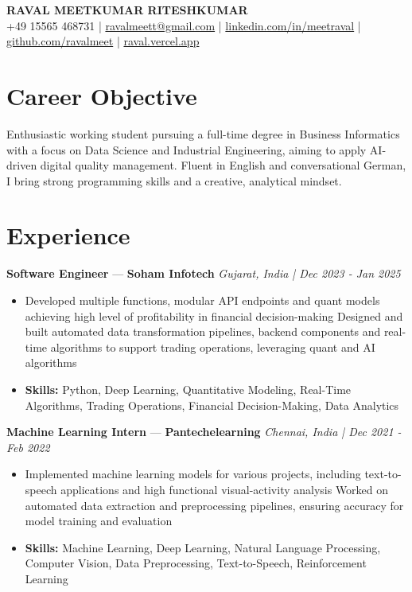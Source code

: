\documentclass[a4paper,10pt]{article}
\begin{document}
\begin{center}
  {\Large\bfseries RAVAL MEETKUMAR RITESHKUMAR}\\[2pt]
  {\small +49 15565 468731 \;|\; \href{mailto:ravalmeett@gmail.com}{ravalmeett@gmail.com} \;|\; \href{https://www.linkedin.com/in/meetraval/}{linkedin.com/in/meetraval} \;|\; \href{https://github.com/ravalmeet}{github.com/ravalmeet} \;|\; \href{https://raval.vercel.app/}{raval.vercel.app}}
\end{center}
\vspace{-3pt}

\section*{Career Objective}
Enthusiastic working student pursuing a full-time degree in Business Informatics with a focus on Data Science and Industrial Engineering, aiming to apply AI-driven digital quality management. Fluent in English and conversational German, I bring strong programming skills and a creative, analytical mindset.\par

\section*{Experience}
\textbf{Software Engineer} — \textbf{Soham Infotech} \hfill \textit{Gujarat, India \;|\; Dec 2023 - Jan 2025}\par
\vspace{1pt}
\begin{itemize}
  \item Developed multiple functions, modular API endpoints and quant models achieving high level of profitability in financial decision-making Designed and built automated data transformation pipelines, backend components and real-time algorithms to support trading operations, leveraging quant and AI algorithms
  \item \textbf{Skills:} Python, Deep Learning, Quantitative Modeling, Real-Time Algorithms, Trading Operations, Financial Decision-Making, Data Analytics
\end{itemize}
\vspace{3pt}
\textbf{Machine Learning Intern} — \textbf{Pantechelearning} \hfill \textit{Chennai, India \;|\; Dec 2021 - Feb 2022}\par
\vspace{1pt}
\begin{itemize}
  \item Implemented machine learning models for various projects, including text-to-speech applications and high functional visual-activity analysis Worked on automated data extraction and preprocessing pipelines, ensuring accuracy for model training and evaluation
  \item \textbf{Skills:} Machine Learning, Deep Learning, Natural Language Processing, Computer Vision, Data Preprocessing, Text-to-Speech, Reinforcement Learning
\end{itemize}
\end{document}
